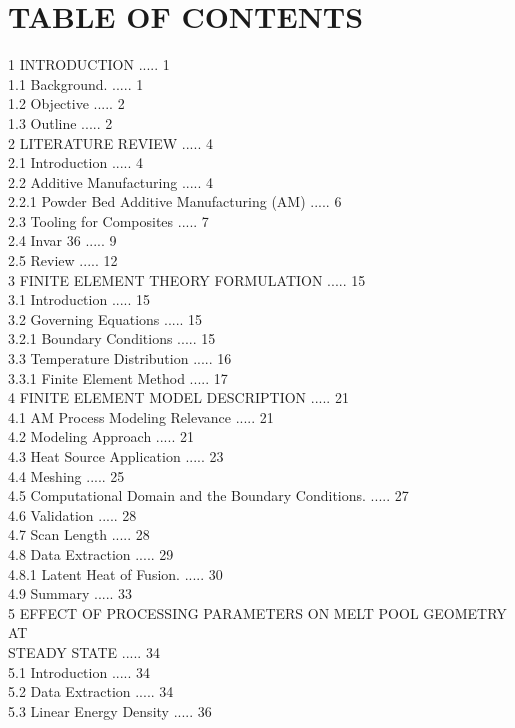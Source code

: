 \documentclass[10pt]{article}
\begin{document}
\section*{TABLE OF CONTENTS}
1 INTRODUCTION ..... 1\\
1.1 Background. ..... 1\\
1.2 Objective ..... 2\\
1.3 Outline ..... 2\\
2 LITERATURE REVIEW ..... 4\\
2.1 Introduction ..... 4\\
2.2 Additive Manufacturing ..... 4\\
2.2.1 Powder Bed Additive Manufacturing (AM) ..... 6\\
2.3 Tooling for Composites ..... 7\\
2.4 Invar 36 ..... 9\\
2.5 Review ..... 12\\
3 FINITE ELEMENT THEORY FORMULATION ..... 15\\
3.1 Introduction ..... 15\\
3.2 Governing Equations ..... 15\\
3.2.1 Boundary Conditions ..... 15\\
3.3 Temperature Distribution ..... 16\\
3.3.1 Finite Element Method ..... 17\\
4 FINITE ELEMENT MODEL DESCRIPTION ..... 21\\
4.1 AM Process Modeling Relevance ..... 21\\
4.2 Modeling Approach ..... 21\\
4.3 Heat Source Application ..... 23\\
4.4 Meshing ..... 25\\
4.5 Computational Domain and the Boundary Conditions. ..... 27\\
4.6 Validation ..... 28\\
4.7 Scan Length ..... 28\\
4.8 Data Extraction ..... 29\\
4.8.1 Latent Heat of Fusion. ..... 30\\
4.9 Summary ..... 33\\
5 EFFECT OF PROCESSING PARAMETERS ON MELT POOL GEOMETRY AT\\
STEADY STATE ..... 34\\
5.1 Introduction ..... 34\\
5.2 Data Extraction ..... 34\\
5.3 Linear Energy Density ..... 36\\
\end{document}
